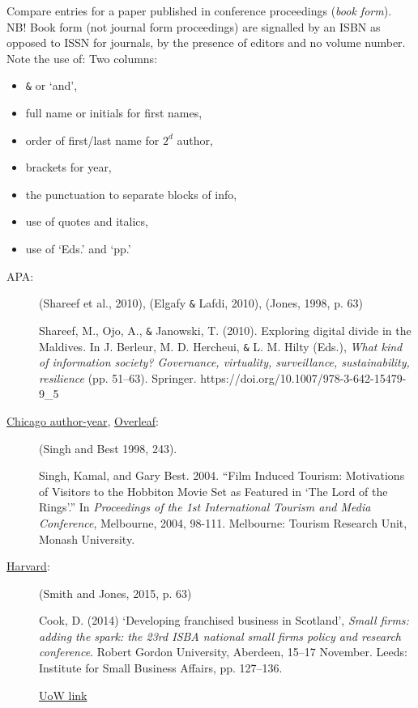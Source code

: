 \documentclass[a4paper,11pt]{article}
\begin{document}
Compare entries for a paper published in conference proceedings (\emph{book form}).\\
NB! Book form (not journal form proceedings) are signalled by an ISBN as opposed to  ISSN for journals, by the presence of editors and no volume number.\\
\medskip
Note the use of:
Two columns:
\begin{multicols}{2}
	\begin{itemize}
		\item \verb|&| or `and',
		\item full name or initials for first names,
		\item order of first/last name for $2^d$ author,
		\item brackets for year,
		\item the punctuation to separate blocks of info,
		\item use of quotes and italics,
		\item use of `Eds.' and `pp.'
	\end{itemize}
\end{multicols}

       

\begin{description}
	\item[APA:]	(Shareef et al., 2010), (Elgafy \verb|&| Lafdi, 2010), (Jones, 1998, p. 63)
	
	Shareef, M., Ojo, A., \verb|&| Janowski, T. (2010). Exploring digital divide in the Maldives. In J. Berleur, M. D. Hercheui, \verb|&| L. M. Hilty (Eds.), \textit{What kind of information society? Governance, virtuality, surveillance, sustainability, resilience} (pp. 51–63). Springer. https://doi.org/10.1007/978-3-642-15479-9\_5
	
	\item[\href{https://www.chicagomanualofstyle.org/tools_citationguide/citation-guide-2.html}{Chicago author-year}, \href{https://www.overleaf.com/2121398454pztnvnjshsgk}{Overleaf}:]
	(Singh and Best 1998, 243).
	
	Singh, Kamal, and Gary Best. 2004. ``Film Induced Tourism: Motivations of Visitors to the Hobbiton Movie Set as Featured in `The Lord of the Rings'.'' In \textit{Proceedings of the 1st International Tourism and Media Conference}, Melbourne, 2004, 98-111. Melbourne: Tourism Research Unit, Monash University.
	
	\item[\href{https://www.citethemrightonline.com/comms/conferences/individual-conference-papers}{Harvard}:] (Smith and Jones, 2015, p. 63)
	
	Cook, D. (2014) `Developing franchised business in Scotland', \textit{Small firms: adding the spark: the 23rd ISBA national small firms policy and research conference}. Robert Gordon University, Aberdeen, 15–17 November. Leeds: Institute for Small Business Affairs, pp. 127–136.
	
	\href{https://www.wlv.ac.uk/lib/media/departments/lis/skills/study-guides/LS134-Harvard-Quick-Guide-2018.pdf}{UoW link}
	
\end{description}
\end{document}

